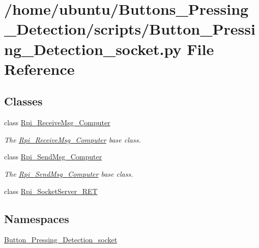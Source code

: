 \hypertarget{a00014}{}\section{/home/ubuntu/\+Buttons\+\_\+\+Pressing\+\_\+\+Detection/scripts/\+Button\+\_\+\+Pressing\+\_\+\+Detection\+\_\+socket.py File Reference}
\label{a00014}
\subsection*{Classes}
\begin{DoxyCompactItemize}
\item 
class \hyperlink{a00041}{Rpi\+\_\+\+Receive\+Msg\+\_\+\+Computer}
\begin{DoxyCompactList}\small\item\em The \hyperlink{a00041}{Rpi\+\_\+\+Receive\+Msg\+\_\+\+Computer} base class. \end{DoxyCompactList}\item 
class \hyperlink{a00045}{Rpi\+\_\+\+Send\+Msg\+\_\+\+Computer}
\begin{DoxyCompactList}\small\item\em The \hyperlink{a00045}{Rpi\+\_\+\+Send\+Msg\+\_\+\+Computer} base class. \end{DoxyCompactList}\item 
class \hyperlink{a00049}{Rpi\+\_\+\+Socket\+Server\+\_\+\+R\+ET}
\end{DoxyCompactItemize}
\subsection*{Namespaces}
\begin{DoxyCompactItemize}
\item 
 \hyperlink{a00024}{Button\+\_\+\+Pressing\+\_\+\+Detection\+\_\+socket}
\end{DoxyCompactItemize}
